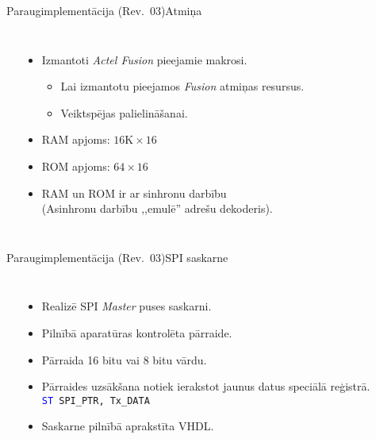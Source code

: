 \documentclass[xetex]{beamer} %
\begin{document}
	\begin{frame}{Paraugimplementācija (Rev.~03)}{Atmiņa}
		\begin{columns}
			{\def\svgscale{0.85} \small }
			\begin{itemize}
				\item Izmantoti \textit{Actel Fusion} pieejamie makrosi.
				\begin{itemize}%
					\item Lai izmantotu pieejamos \textit{Fusion} atmiņas resursus.
					\item Veiktspējas palielināšanai.
				\end{itemize}
				\item RAM apjoms: $16\mathrm{K} \times 16$
				\item ROM apjoms: $64 \times 16$
				\item RAM un ROM ir ar sinhronu darbību\\
					(Asinhronu darbību ,,emulē'' adrešu dekoderis).
			\end{itemize}
		\end{columns}
	\end{frame}
	
	\begin{frame}{Paraugimplementācija (Rev.~03)}{SPI saskarne}
		\begin{columns}
		\column{0.10\textwidth}
			{\def\svgscale{0.85} \small }
		\column{0.89\textwidth}
			\begin{itemize}
				\item Realizē SPI \textit{Master} puses saskarni.
				\item Pilnībā aparatūras kontrolēta pārraide.
				\item Pārraida 16 bitu vai 8 bitu vārdu.
				\item Pārraides uzsākšana notiek ierakstot jaunus datus
					speciālā reģistrā.\\
					\texttt{\textcolor{blue}{ST} SPI\_PTR, Tx\_DATA}
				\item Saskarne pilnībā aprakstīta VHDL.
			\end{itemize}
		\end{columns}
	\end{frame}
	
\end{document}
